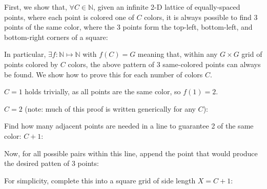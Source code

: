 \documentclass[11pt]{article}
\newcommand{\N}{\mathbb{N}}
\newcommand*{\scalePic}{0.4}
\begin{document}
First, we show that, $\forall C\in\N$, given an infinite 2-D lattice of equally-spaced points, where each point is colored one of $C$ colors, it is always possible to find 3 points of the same color, where the 3 points form the top-left, bottom-left, and bottom-right corners of a square:

\begin{center}
\end{center}

In particular, $\exists f : \N \mapsto \N$ with $f(C) = G$ meaning that, within any $G \times G$ grid of points colored by $C$ colors, the above pattern of 3 same-colored points can always be found. We show how to prove this for each number of colors $C$.

$C=1$ holds trivially, as all points are the same color, so $f(1)=2$.

$C=2$ (note: much of this proof is written generically for any $C$):

Find how many adjacent points are needed in a line to guarantee 2 of the same color: $C+1$:

\begin{center}
\end{center}

Now, for all possible pairs within this line, append the point that would produce the desired patten of 3 points:

\begin{center}
\end{center}

For simplicity, complete this into a square grid of side length $X=C+1$:

\begin{center}
\end{center}
\end{document}
